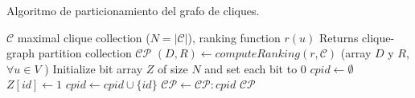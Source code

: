 \begin{algorithm}
\caption{Algoritmo de particionamiento del grafo de cliques.}
\label{alg:clustering}
\begin{algorithmic}[1]
\REQUIRE $\mathcal{C}$ maximal clique collection ($N=|\mathcal{C}|$), ranking function $r(u)$
\ENSURE Returns clique-graph partition collection $\mathcal{C}\mathcal{P}$
\STATE $(D,R) \leftarrow computeRanking(r,\mathcal{C})$ (array $D$ y $R$, $\forall u \in V$ ) \label{alg:clustering:rankarray} 
\STATE Initialize bit array $Z$ of size $N$ and set each bit to 0
    \STATE $cpid \leftarrow \emptyset$
          \STATE $Z[id] \leftarrow 1$
          \STATE $cpid \leftarrow cpid \cup \{id\}$
    \ENDFOR
      \STATE $\mathcal{C}\mathcal{P} \leftarrow \mathcal{C}\mathcal{P} : cpid$
    \ENDIF 
 \ENDFOR
\RETURN $\mathcal{C}\mathcal{P}$
\end{algorithmic}
\end{algorithm}
